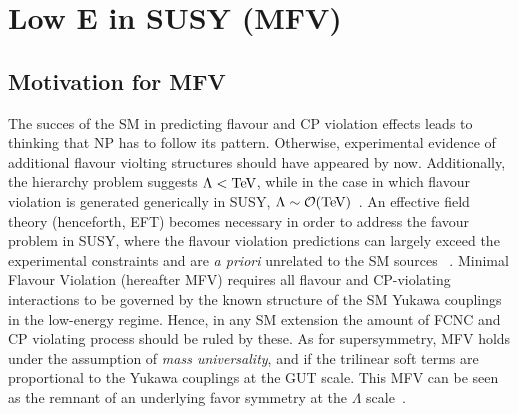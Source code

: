 \chapter{Low E in SUSY (MFV)}
\label{sec:SUSY}



\section{Motivation for MFV}
\label{sec:MFVMot}
The succes of the SM in predicting flavour and CP violation effects leads to thinking that NP has to follow its pattern. Otherwise, experimental evidence of additional flavour violting structures should have appeared by now. Additionally, the hierarchy problem suggests $\Lambda < \rm TeV$, while in the case in which flavour violation is generated generically in SUSY, $\Lambda \sim \mathcal{O}(\rm TeV)$~\cite{Paradisi:2009ey}. 
An effective field theory (henceforth, EFT) becomes necessary in order to address the favour problem in SUSY, where the flavour violation predictions can largely exceed the experimental constraints and are \textit{a priori} unrelated to the SM sources ~\cite{Altmannshofer:2007cs}. 
Minimal Flavour Violation (hereafter MFV) requires all flavour and CP-violating interactions to be governed by the known structure of the SM Yukawa couplings~\cite{DAmbrosio:2002vsn} in the low-energy regime. Hence, in any SM extension the amount of FCNC and CP violating process should be ruled by these.  
As for supersymmetry, MFV holds under the assumption of \textit{mass universality}, and if the trilinear soft terms are proportional to the Yukawa couplings at the GUT scale. 
This MFV can be seen as the remnant of an underlying favor symmetry at the $\Lambda$ scale~\cite{Paradisi:2009ey}. 


